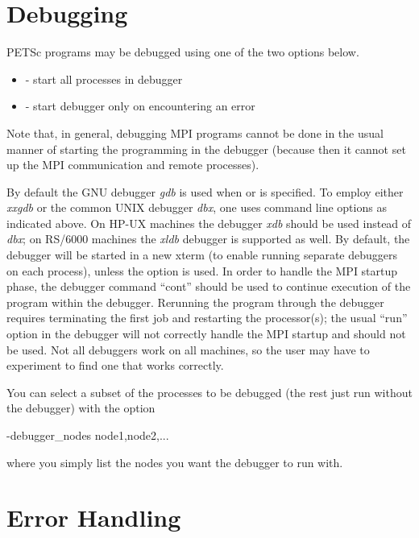 {{{\section{Debugging}  \label{sec_debugging}

PETSc programs may be debugged using one of the two options below.
\begin{itemize}
\item {}  
     - start all processes in debugger
\item {} 
       - start debugger only on encountering an error
\end{itemize}
Note that, in general, debugging MPI programs cannot be done in the usual
manner of starting the programming in the debugger (because then it cannot
set up the MPI communication and remote processes).

By default the GNU debugger {\em gdb} is used when 
or  is specified. 
To employ either {\em xxgdb} or the common UNIX debugger {\em dbx}, one uses
command line options as indicated above. On HP-UX machines the debugger
{\em xdb} should be used instead of {\em dbx}; on RS/6000 machines the
{\em xldb} debugger is supported as well.
By  default, the debugger will be started in a new xterm (to enable
running separate debuggers on each process), unless the option
 is used.
In order to handle the MPI startup phase, the debugger command ``cont''
should be used to continue execution of the program within the debugger.
Rerunning the program through the debugger requires terminating
the first job and restarting the processor(s); the usual ``run''
option in the debugger will not correctly handle the MPI startup and
should not be used.  Not all debuggers work on all machines, so the user
may have to experiment to find one that works correctly.

You can select a subset of the processes to be debugged (the rest just run
without the debugger) with the option
\begin{tabbing}
  -debugger\_nodes node1,node2,...
\end{tabbing}
where you simply list the nodes you want the debugger to run with.

\section{Error Handling}  

}}}
